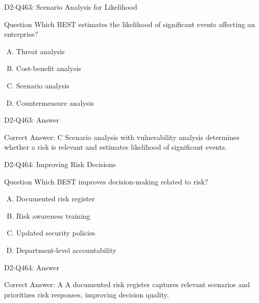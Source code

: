\documentclass{beamer}
\begin{document}
\begin{frame}{D2-Q463: Scenario Analysis for Likelihood}
	\begin{block}{Question}
		Which BEST estimates the likelihood of significant events affecting an enterprise?
	\end{block}
	\begin{enumerate}[(A)]
		\item Threat analysis
		\item Cost-benefit analysis
		\item Scenario analysis
		\item Countermeasure analysis
	\end{enumerate}
\end{frame}
\begin{frame}{D2-Q463: Answer}
	\begin{block}{Correct Answer: C}
		Scenario analysis with vulnerability analysis determines whether a risk is relevant and estimates likelihood of significant events.
	\end{block}
\end{frame}

\begin{frame}{D2-Q464: Improving Risk Decisions}
	\begin{block}{Question}
		Which BEST improves decision-making related to risk?
	\end{block}
	\begin{enumerate}[(A)]
		\item Documented risk register
		\item Risk awareness training
		\item Updated security policies
		\item Department-level accountability
	\end{enumerate}
\end{frame}
\begin{frame}{D2-Q464: Answer}
	\begin{block}{Correct Answer: A}
		A documented risk register captures relevant scenarios and prioritizes risk responses, improving decision quality.
	\end{block}
\end{frame}
\end{document}
